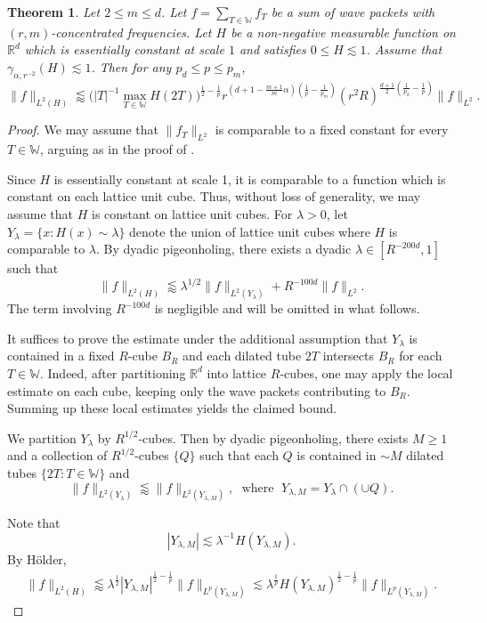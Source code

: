 \documentclass[11pt]{amsart}
\newtheorem{theorem}{Theorem}[section]
\theoremstyle{definition}
\theoremstyle{remark}
\numberwithin{equation}{section}
\newcommand{\R}{\mathbb{R}}
\newcommand{\W}{\mathbb{W}}
\newcommand{\les}{\lesssim}
\newcommand{\less}{\lessapprox}
\newcommand{\la}{\lambda}
\begin{document}
\begin{theorem}\label{thm:measureVer}
	Let $2\leq m \leq d$. Let $f = \sum_{T \in \W} f_T$ be a sum of wave packets with $(r, m)$-concentrated frequencies. 
	Let $H$ be a non-negative measurable function on $\R^d$ which is essentially
	constant at scale $1$ and satisfies $0\leq H\les 1$. Assume that $\gamma_{\alpha,r^{-2}}(H) \les 1$. Then for any $p_d\leq p\leq p_m$, 
	\[ \| f\|_{L^2(H)} \less \big(  |T|^{-1} \max_{T\in \W} H(2T) \big)^{\frac{1}{2}-\frac{1}{p}} r^{(d+1 - \frac{m+1}{m}\alpha)(\frac{1}{p}-\frac{1}{p_m})} (r^2 R)^{\frac{d+1}{2}(\frac{1}{p_d} -\frac{1}{p})} \| f\|_{L^2}.  \]
\end{theorem}
\begin{proof}
We may assume that $\| f_T \|_{L^2}$ is comparable to a fixed constant for every $T\in \W$, arguing as in the proof of .

Since $H$ is essentially constant at scale 1, it is comparable to a function which is constant on each lattice unit cube. Thus, without loss of generality, we may assume that $H$ is constant on lattice unit cubes. For $\la>0$, let $Y_\lambda = \{ x: H(x) \sim \lambda\}$ denote the union of lattice unit cubes where $H$ is comparable to $\la$. By dyadic pigeonholing, there exists  a dyadic $\lambda \in [R^{-200d}, 1]$ such that 
    \[ \| f\|_{L^2(H)} \less \lambda^{1/2} \| f\|_{L^2(Y_\la)} + R^{-100d} \| f\|_{L^2}. \]
    The term involving $R^{-100d}$ is negligible and will be omitted in what follows.
    
 
It suffices to prove the estimate under the additional assumption that
$Y_\lambda$ is contained in a fixed $R$-cube $B_R$ and each dilated tube $2T$ intersects $B_R$ for each $T\in \W$. Indeed, after partitioning
$\mathbb R^d$ into lattice $R$-cubes, one may apply the local estimate on each
cube, keeping only the wave packets contributing to $B_R$. Summing up these local estimates yields the claimed bound. 

We partition $Y_\la$ by $R^{1/2}$-cubes. Then by dyadic pigeonholing, there exists $M\geq 1$ and a collection of $R^{1/2}$-cubes $\{ Q\}$ such that each $Q$ is contained  in $\sim M$ dilated tubes $\{ 2T: T\in \W\}$ and 
  \[ \| f\|_{L^2(Y_\la)} \less \| f\|_{L^2(Y_{\la,M})}, \; \text{ where } \; Y_{\la,M} = Y_\la \cap (\cup Q). \]

 Note that 
\[ |Y_{\la,M}| \les \la^{-1} H(Y_{\la,M}).\]
  By H\"older,
  \begin{align*}
  	\| f\|_{L^2(H)} \less \lambda^{\frac{1}{2}} |Y_{\la,M}|^{\frac{1}{2}-\frac{1}{p}} \| f\|_{L^p(Y_{\la,M})}  \les \la^{\frac{1}{p}} H(Y_{\la,M})^{\frac{1}{2}-\frac{1}{p}} \| f\|_{L^p(Y_{\la,M})} .
  \end{align*}


\end{proof}
\end{document}
